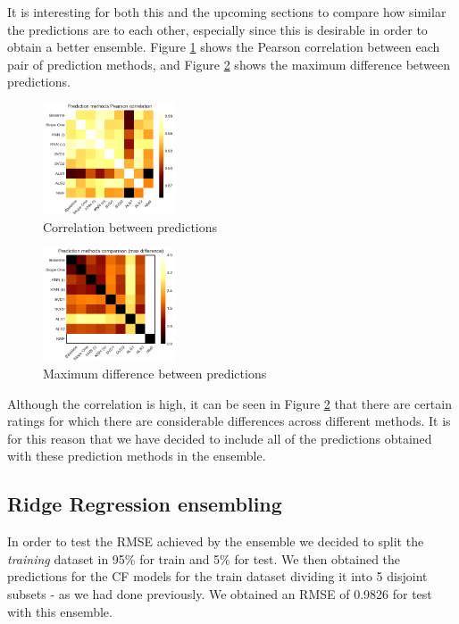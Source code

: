 \documentclass[10pt,conference,compsocconf]{IEEEtran}
\begin{document}
    It is interesting for both this and the upcoming sections to compare how similar the predictions are to each other, especially since this is desirable in order to obtain a better ensemble. Figure \ref{fig:CFcompcorr} shows the Pearson correlation between each pair of prediction methods, and Figure \ref{fig:CFcompmax} shows the maximum difference between predictions.

    \begin{figure}[htp]
      \centering
      \includegraphics[width=0.35\textwidth]{CFcompcorr}
      \caption{Correlation between predictions} %
      \label{fig:CFcompcorr}
    \end{figure}

    \begin{figure}[htp]
      \centering
      \includegraphics[width=0.35\textwidth]{CFcompmax}
      \caption{Maximum difference between predictions} %
      \label{fig:CFcompmax}
    \end{figure}

    Although the correlation is high, it can be seen in Figure \ref{fig:CFcompmax} that there are certain ratings for which there are considerable differences across different methods. It is for this reason that we have decided to include all of the predictions obtained with these prediction methods in the ensemble.
  \subsection{Ridge Regression ensembling} %
  \label{sub:ridge_regression_ensembling}
    In order to test the RMSE achieved by the ensemble we decided to split the \emph{training} dataset in 95\% for train and 5\% for test. We then obtained the predictions for the CF models for the train dataset dividing it into 5 disjoint subsets - as we had done previously. We obtained an RMSE of 0.9826 for test with this ensemble.
\end{document}
